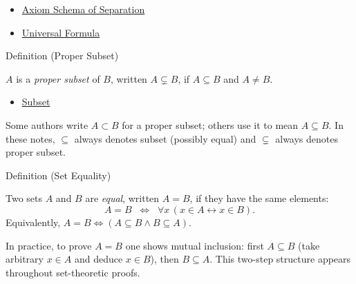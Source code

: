 \begin{dependencies}
\begin{itemize}
  \item \hyperref[ax:separation]{Axiom Schema of Separation}
  \item \hyperref[def:universal-q]{Universal Formula}
\end{itemize}
\end{dependencies}

\begin{definitionbox}{Definition (Proper Subset)}
\begin{definition}\label{def:proper-subset}
$A$ is a \emph{proper subset} of $B$, written $A \subsetneq B$, if
$A \subseteq B$ and $A \neq B$.
\end{definition}
\end{definitionbox}

\begin{dependencies}
\begin{itemize}
  \item \hyperref[def:subset]{Subset}
\end{itemize}
\end{dependencies}

\begin{remark*}
Some authors write $A \subset B$ for a proper subset; others use it to mean
$A \subseteq B$. In these notes, $\subseteq$ always denotes subset (possibly
equal) and $\subsetneq$ always denotes proper subset.
\end{remark*}

\begin{definitionbox}{Definition (Set Equality)}
\begin{definition}\label{def:set-equality}
Two sets $A$ and $B$ are \emph{equal}, written $A = B$, if they have the same
elements:
\[
A = B \;\;\Longleftrightarrow\;\; \forall x \, (x \in A \leftrightarrow x \in B).
\]
Equivalently, $A = B \iff (A \subseteq B \land B \subseteq A)$.
\end{definition}
\end{definitionbox}

\begin{remark*}
In practice, to prove $A = B$ one shows mutual inclusion: first $A \subseteq B$
(take arbitrary $x \in A$ and deduce $x \in B$), then $B \subseteq A$.
This two-step structure appears throughout set-theoretic proofs.
\end{remark*}

